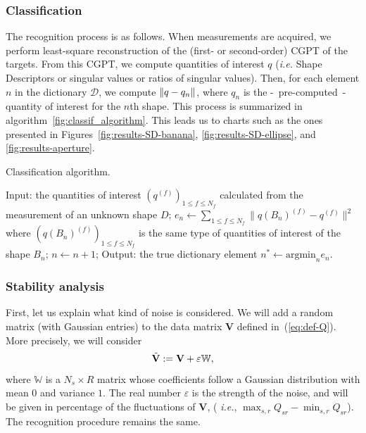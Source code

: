 \subsubsection{Classification}

The recognition process is as follows. When measurements are
acquired, we perform least-square reconstruction of the (first- or
second-order) CGPT of the targets. From this CGPT, we compute
quantities of interest $q$ (\emph{i.e.} Shape Descriptors or
singular values or ratios of singular values). Then, for each
element $n$ in the dictionary $\mathcal{D}$, we compute
$\mathopen\| q-q_n \mathclose\|$, where $q_n$ is the -~pre-computed~- quantity of
interest for the $n$th shape. This process is summarized in algorithm~\ref{fig:classif_algorithm}. This leads us to charts such as the
ones presented in Figures~\ref{fig:results-SD-banana},
\ref{fig:results-SD-ellipse}, and \ref{fig:results-aperture}.


\begin{algorithm}
    \begin{algorithmic}
    \caption{Classification algorithm.}
    \label{fig:classif_algorithm}
      \STATE Input: the quantities of interest $\left(q^{(f)}\right)_{1\leq f\leq N_f}$ calculated from
      the measurement of an
      unknown shape $D$;
      \STATE $e_n\leftarrow \sum_{1\leq f \leq N_f} \| q(B_n)^{(f)} - q^{(f)} \|^2 $ where $\left( q(B_n)^{(f)}
      \right)_{1\leq f \leq N_f}$ is the same type of quantities of interest of the shape $B_n$;
      \STATE $n\leftarrow n+1$;
      \ENDFOR
      \STATE Output: the true dictionary element $n^*\leftarrow \mbox{argmin}_n e_n$.
    \end{algorithmic}
\end{algorithm}

\subsubsection{Stability analysis}

First, let us explain what kind of noise is considered. We will
add a random matrix (with Gaussian entries) to the data matrix $
$$\mathbf{V}$ defined in~(\ref{eq:def-Q}). More precisely, we will
consider
\[
\tilde{\mathbf{V}}:=\mathbf{V}+\varepsilon\mbox{\ensuremath{\mathbb{W}}},
\]
where $\mathbb{W}$ is a $N_s\times R$ matrix whose coefficients
follow a Gaussian distribution with mean $0$ and variance $1$. The
real number $\varepsilon$ is the strength of the noise, and will
be given in percentage of the fluctuations of $\mathbf{V}$, ({\it
i.e.},  $\max_{s,r}Q_{sr}-\min_{s,r}Q_{sr}$). The recognition
procedure remains the same.

